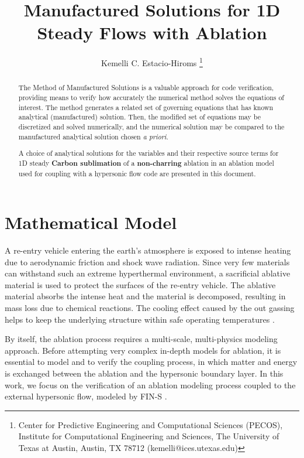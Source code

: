 \documentclass[10pt]{article}
\title{Manufactured Solutions for 1D Steady Flows with Ablation}
\author{Kemelli C. Estacio-Hiroms \thanks{Center for Predictive Engineering and Computational Sciences (PECOS), Institute for Computational
    Engineering and Sciences, The University of Texas at Austin,
    Austin, TX 78712 (kemelli@ices.utexas.edu)}}
\begin{document}
\maketitle
\tableofcontents

\begin{abstract}
The Method of Manufactured Solutions is a valuable approach for code verification, providing means to verify how accurately the numerical method solves the equations of interest. The method generates a related set of governing equations that has known analytical (manufactured) solution. Then, the modified set of equations may be discretized and solved numerically, and the numerical solution may be compared to the manufactured analytical solution  chosen \textit{a priori}.

A choice of analytical solutions for the variables and their respective source terms for 1D steady \textbf{Carbon sublimation} of a \textbf{non-charring} ablation in an ablation model used for coupling with a hypersonic flow code are presented in this document.
\end{abstract}




\section{Mathematical Model}

A re-entry vehicle entering the earth's atmosphere is exposed to intense heating due to aerodynamic friction and shock wave
radiation. Since very few materials can withstand such an extreme hyperthermal environment, a sacrificial ablative material is used to
protect the surfaces of the re-entry vehicle. The ablative material absorbs the intense heat and the material is decomposed, resulting in mass loss due to chemical reactions. The cooling effect caused by the out gassing helps to keep the underlying structure within safe operating temperatures \citep{Rochan2010b}.

By itself, the ablation process requires a multi-scale, multi-physics modeling approach. Before attempting very complex in-depth models for ablation, it is essential to model and to verify the coupling process,
in which matter and energy is exchanged between the ablation and the hypersonic boundary layer. In this
work, we focus on the verification  of an ablation modeling process coupled to the external hypersonic flow, modeled by FIN-S \citep{Kirk2009}. 
\end{document}
